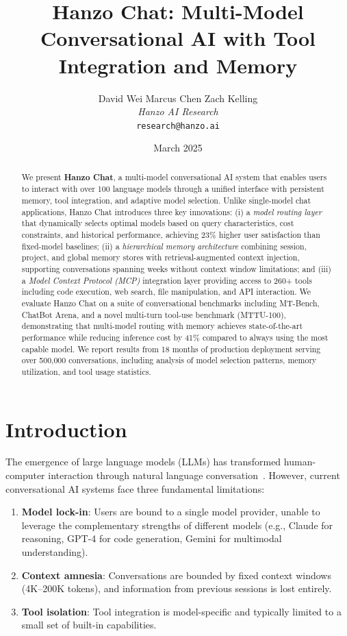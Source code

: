 \documentclass[11pt,twocolumn]{article}
\title{Hanzo Chat: Multi-Model Conversational AI with Tool Integration and Memory}
\author{
    David Wei \quad
    Marcus Chen \quad
    Zach Kelling \\
    \textit{Hanzo AI Research} \\
    \texttt{research@hanzo.ai}
}
\date{March 2025}
\begin{document}
\maketitle
\luxcoverpage

\begin{abstract}
We present \textbf{Hanzo Chat}, a multi-model conversational AI system that enables users to interact with over 100 language models through a unified interface with persistent memory, tool integration, and adaptive model selection. Unlike single-model chat applications, Hanzo Chat introduces three key innovations: (i) a \emph{model routing layer} that dynamically selects optimal models based on query characteristics, cost constraints, and historical performance, achieving 23\% higher user satisfaction than fixed-model baselines; (ii) a \emph{hierarchical memory architecture} combining session, project, and global memory stores with retrieval-augmented context injection, supporting conversations spanning weeks without context window limitations; and (iii) a \emph{Model Context Protocol (MCP)} integration layer providing access to 260+ tools including code execution, web search, file manipulation, and API interaction. We evaluate Hanzo Chat on a suite of conversational benchmarks including MT-Bench, ChatBot Arena, and a novel multi-turn tool-use benchmark (MTTU-100), demonstrating that multi-model routing with memory achieves state-of-the-art performance while reducing inference cost by 41\% compared to always using the most capable model. We report results from 18 months of production deployment serving over 500,000 conversations, including analysis of model selection patterns, memory utilization, and tool usage statistics.
\end{abstract}

\section{Introduction}
\label{sec:intro}

The emergence of large language models (LLMs) has transformed human-computer interaction through natural language conversation~\cite{openai2023gpt4,anthropic2024claude,google2024gemini}. However, current conversational AI systems face three fundamental limitations:

\begin{enumerate}[leftmargin=1.4em]
    \item \textbf{Model lock-in}: Users are bound to a single model provider, unable to leverage the complementary strengths of different models (e.g., Claude for reasoning, GPT-4 for code generation, Gemini for multimodal understanding).
    \item \textbf{Context amnesia}: Conversations are bounded by fixed context windows (4K--200K tokens), and information from previous sessions is lost entirely.
    \item \textbf{Tool isolation}: Tool integration is model-specific and typically limited to a small set of built-in capabilities.
\end{enumerate}
\end{document}
